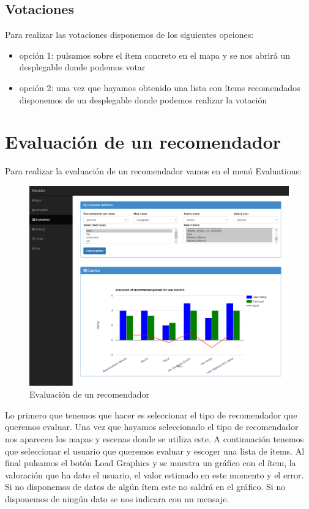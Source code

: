 \subsection{Votaciones}

Para realizar las votaciones disponemos de los siguientes opciones:

\begin{itemize}
	\item opción 1: pulsamos sobre el ítem concreto en el mapa y se nos abrirá un desplegable donde podemos votar
	\item opción 2: una vez que hayamos obtenido una lista con ítems recomendados disponemos de un desplegable donde podemos realizar la votación
\end{itemize}

\newpage

\section{Evaluación de un recomendador}

Para realizar la evaluación de un recomendador vamos en el menú Evaluations:

\begin{figure}[H]
	\centering\includegraphics[scale=0.35]{imagenes/capitulo12/evaluacion.png}
	\caption{Evaluación de un recomendador}
	\label{img:evaluacion}
\end{figure}

Lo primero que tenemos que hacer es seleccionar el tipo de recomendador que queremos evaluar. Una vez que hayamos seleccionado el tipo de recomendador nos aparecen los mapas y escenas donde se utiliza este. A continuación tenemos que seleccionar el usuario que queremos evaluar y escoger una lista de ítems. Al final pulsamos el botón Load Graphics y se muestra un gráfico con el ítem, la valoración que ha dato el usuario, el valor estimado en este momento y el error. Si no disponemos de datos de algún ítem este no saldrá en el gráfico. Si no disponemos de ningún dato se nos indicara con un mensaje.
